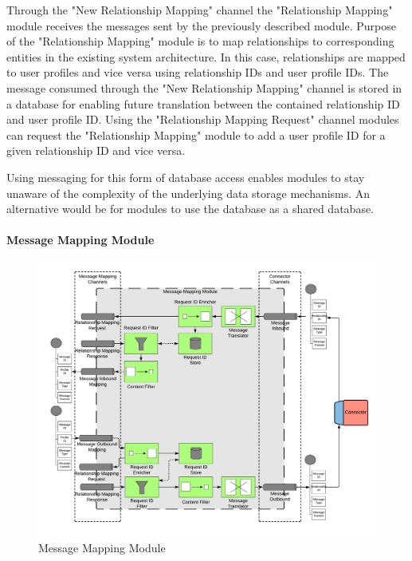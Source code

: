 Through the "New Relationship Mapping" channel the "Relationship Mapping" module receives the messages sent by the previously described module. Purpose of the "Relationship Mapping" module is to map relationships to corresponding entities in the existing system architecture. In this case, relationships are mapped to user profiles and vice versa using relationship IDs and user profile IDs. The message consumed through the "New Relationship Mapping" channel is stored in a database for enabling future translation between the contained relationship ID and user profile ID. Using the "Relationship Mapping Request" channel modules can request the "Relationship Mapping" module to add a user profile ID for a given relationship ID and vice versa.

Using messaging for this form of database access enables modules to stay unaware of the complexity of the underlying data storage mechanisms. An alternative would be for modules to use the database as a shared database.

\paragraph{Message Mapping Module}

\begin{figure}[h!]
    \centering
    \includegraphics[scale=0.6]{Diagrams/Integration Architecture 1/Technological Integration/10. Message Mapping Module.pdf}
    \caption{Message Mapping Module}
    \label{integration1:message_mapping_module}
\end{figure}

